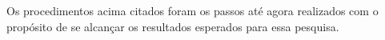 	\par Os procedimentos acima citados foram os passos até agora realizados com o
propósito de se alcançar os resultados esperados para essa pesquisa.






